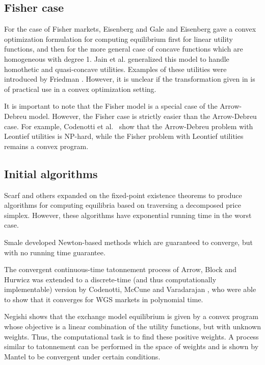 \documentclass{article}
\begin{document}
\subsection{Fisher case}
For the case of Fisher markets,
Eisenberg and Gale \cite{eisenberg1959consensus, gale1960theory} and
Eisenberg \cite{eisenberg1961aggregation} gave a convex optimization formulation for computing equilibrium first for linear utility functions, and then for the more general case of concave functions which are homogeneous with degree 1.
Jain et al. \cite{jain2005market} generalized this model to handle homothetic and quasi-concave utilities.
Examples of these utilities were introduced by Friedman
\cite{friedman1973concavity}.
However, it is unclear if the transformation given in \cite{jain2005market} is of practical use in a convex optimization setting.

It is important to note that the Fisher model is a special case of the Arrow-Debreu model. However, the Fisher case is strictly easier than the Arrow-Debreu case. For example, Codenotti et al.\ \cite{codenotti2006leontief} show that the Arrow-Debreu problem with Leontief utilities is NP-hard, while the Fisher problem with Leontief utilities remains a convex program.

\subsection{Initial algorithms}

Scarf and others \cite{scarf2008applied,eaves1972homotopies,kuhn1968simplicial}
expanded on the fixed-point existence theorems to produce algorithms for computing equilibria based on traversing a decomposed price simplex. However, these algorithms have exponential running time in the worst case.

Smale \cite{smale1976convergent, smale1976exchange} developed Newton-based methods which are guaranteed to converge, but with no running time guarantee.

The convergent continuous-time tatonnement process of Arrow, Block and Hurwicz \cite{arrow1959stability} was extended to a discrete-time (and thus computationally implementable) version by Codenotti, McCune and Varadarajan \cite{codenotti2005marketExcess}, who were able to show that it converges for WGS markets in polynomial time.

Negishi \cite{negishi1960welfare} shows that the exchange model equilibrium is given by a convex program whose objective is a linear combination of the utility functions, but with unknown weights. Thus, the computational task is to find these positive weights. A process similar to tatonnement can be performed in the space of weights and is shown by Mantel \cite{mantel1971welfare} to be convergent under certain conditions.
\end{document}
